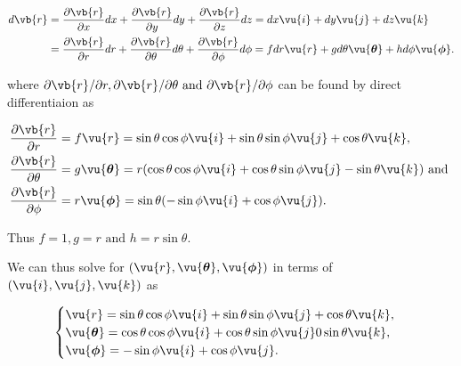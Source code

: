\documentclass[english,a4paper,12pt]{report}
\begin{document}
\begin{equation}
    \begin{aligned}
    d \vb{r} &= \frac{\partial \vb{r} }{\partial x} dx + \frac{\partial \vb{r} }{\partial y} dy + \frac{\partial \vb{r} }{\partial z} dz = dx \vu{i} + dy \vu{j} + dz \vu{k} \\ &= \frac{\partial \vb{r} }{\partial r} dr + \frac{\partial \vb{r} }{\partial \theta }d\theta + \frac{\partial \vb{r} }{\partial \phi }d \phi =f dr \vu{r} +g d\theta \vu{\boldsymbol{\theta } } +h  d \phi \vu{\boldsymbol{\phi } }. 
    \end{aligned}
\end{equation}

where \(\partial \vb{r} /\partial r, \partial \vb{r} /\partial \theta \text { and } \partial \vb{r} /\partial \phi \) can be found by direct differentiaion as 

\begin{equation}
	\begin{aligned} 
		\frac{\partial \vb{r} }{\partial r}   &= f \vu{r} = \sin{\theta}\cos{\phi}\vu{i} + \sin{\theta}\sin{\phi}\vu{j} + \cos{\theta}\vu{k}, \\
		\frac{\partial \vb{r} }{\partial \theta }  &= g \vu{\boldsymbol{\theta }} = r(\cos{\theta}\cos{\phi}\vu{i} + \cos{\theta}\sin{\phi}\vu{j} - \sin{\theta}\vu{k})\text { and }  \\
		\frac{\partial \vb{r} }{\partial \phi }  &= r \vu{\boldsymbol{\phi } } = \sin \theta (-\sin{\phi}\vu{i} + \cos{\phi}\vu{j}). 
	\end{aligned} 
\end{equation}

Thus \(f = 1, g = r \text { and }  h = r\sin \theta \).

We can thus solve for \((\vu{r} , \vu{\boldsymbol{\theta } }, \vu{\boldsymbol{\phi } })\) in terms of \((\vu{i}, \vu{j} ,\vu{k} )\) as 

\begin{equation}
    \begin{cases}
        \vu{r} = \sin \theta \cos \phi  \vu{i}  + \sin \theta \sin \phi  \vu{j}  + \cos \theta  \vu{k},  \\
        \vu{\boldsymbol{\theta } } = \cos \theta \cos \phi \vu{i}  + \cos \theta \sin \phi \vu{j} 0 \sin \theta \vu{k}, \\
        \vu{\boldsymbol{\phi } } = -\sin \phi  \vu{i} + \cos \phi \vu{j}. 
    \end{cases}
\end{equation}
\end{document}
